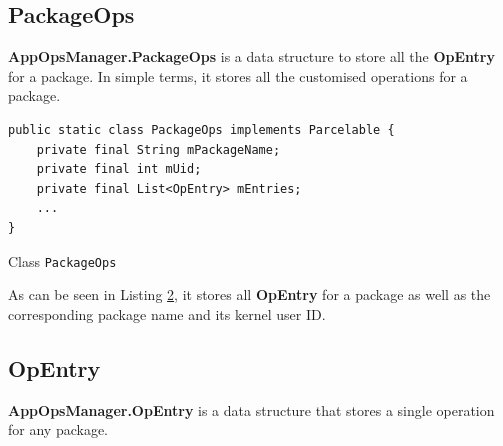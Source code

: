 \subsection{PackageOps}\label{subsec:package-ops} %
\textbf{AppOpsManager.PackageOps} is a data structure to store all the \textbf{OpEntry} for a package. In simple terms,
it stores all the customised operations for a package.

\begin{listing}[H]
    \begin{verbatim}
public static class PackageOps implements Parcelable {
    private final String mPackageName;
    private final int mUid;
    private final List<OpEntry> mEntries;
    ...
}
    \end{verbatim}
    \caption{Class \texttt{PackageOps}} %
    \label{lst:package-ops-class}
\end{listing}

As can be seen in Listing \hyperref[cb12]{2}, it stores all \textbf{OpEntry} for a package as well as the
corresponding package name and its kernel user ID\@.

\subsection{OpEntry}\label{subsec:opentry} %
\textbf{AppOpsManager.OpEntry} is a data structure that stores a single operation for any package.

